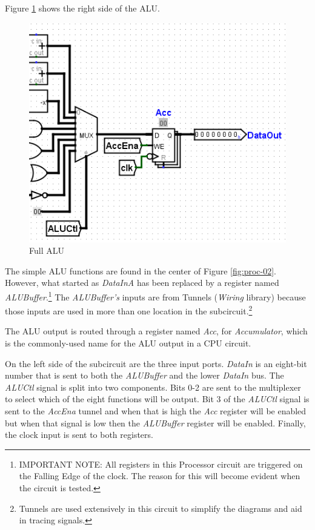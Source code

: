 Figure \ref{fig:proc-03} shows the right side of the ALU.

\begin{figure}[H]
	\centering
	\includegraphics[width=\maxwidth{.95\linewidth}]{gfx/proc-03}
	\caption{Full ALU}
	\label{fig:proc-03}
\end{figure}

The simple \ac{ALU} functions are found in the center of Figure \ref{fig:proc-02}. However, what started as \textit{DataInA} has been replaced by a register named \textit{ALUBuffer}.\footnote{IMPORTANT NOTE: All registers in this Processor circuit are triggered on the Falling Edge of the clock. The reason for this will become evident when the circuit is tested.} The \textit{ALUBuffer's} inputs are from Tunnels (\textit{Wiring} library) because those inputs are used in more than one location in the subcircuit.\footnote{Tunnels are used extensively in this circuit to simplify the diagrams and aid in tracing signals.}

The \ac{ALU} output is routed through a register named \textit{Acc}, for \textit{Accumulator}, which is the commonly-used name for the \ac{ALU} output in a \ac{CPU} circuit.

On the left side of the subcircuit are the three input ports. \textit{DataIn} is an eight-bit number that is sent to both the \textit{ALUBuffer} and the lower \textit{DataIn} bus. The \textit{ALUCtl} signal is split into two components. Bits 0-2 are sent to the multiplexer to select which of the eight functions will be output. Bit 3 of the \textit{ALUCtl} signal is sent to the \textit{AccEna} tunnel and when that is high the \textit{Acc} register will be enabled but when that signal is low then the \textit{ALUBuffer} register will be enabled. Finally, the clock input is sent to both registers.

